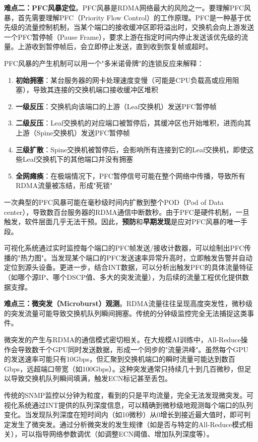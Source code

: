 \textbf{难点二：PFC风暴定位}。PFC风暴是RDMA网络最大的风险之一。要理解PFC风暴，首先需要理解PFC（Priority Flow Control）的工作原理。PFC是一种基于优先级的流量控制机制，当某个端口的接收缓冲区即将溢出时，交换机会向上游发送一个PFC暂停帧（Pause Frame），要求上游在指定时间内停止发送该优先级的流量。上游收到暂停帧后，会立即停止发送，直到收到恢复帧或超时。

PFC风暴的产生机制可以用一个"多米诺骨牌"的连锁反应来解释：
\begin{enumerate}
    \item \textbf{初始拥塞}：某台服务器的网卡处理速度变慢（可能是CPU负载高或应用阻塞），导致其连接的交换机端口接收缓冲区堆积
    \item \textbf{一级反压}：交换机向该端口的上游（Leaf交换机）发送PFC暂停帧
    \item \textbf{二级反压}：Leaf交换机的对应端口被暂停后，其缓冲区也开始堆积，进而向其上游（Spine交换机）发送PFC暂停帧
    \item \textbf{三级扩散}：Spine交换机被暂停后，会影响所有连接到它的Leaf交换机，即使这些Leaf交换机下的其他端口并没有拥塞
    \item \textbf{全网瘫痪}：在极端情况下，PFC暂停信号可能在整个网络中传播，导致所有RDMA流量被冻结，形成"死锁"
\end{enumerate}

一次典型的PFC风暴可能在毫秒级时间内扩散到整个POD（Pod of Data center），导致数百台服务器的RDMA通信中断数秒。由于PFC是硬件机制，一旦触发，软件层面几乎无法干预。因此，\textbf{预防}和\textbf{早期发现}是应对PFC风暴的唯一手段。

可视化系统通过实时监控每个端口的PFC帧发送/接收计数器，可以绘制出PFC传播的"热力图"。当发现某个端口的PFC发送速率异常升高时，立即触发告警并自动定位到源头设备。更进一步，结合INT数据，可以分析出触发PFC的具体流量特征（如哪个源IP、哪个DSCP值、多大的突发流量），为后续的流量工程优化提供数据支撑。

\textbf{难点三：微突发（Microburst）观测}。RDMA流量往往呈现高度突发性，微秒级的突发流量可能导致交换机队列瞬间拥塞。传统的分钟级监控完全无法捕捉这类事件。

微突发的产生与RDMA的通信模式密切相关。在大规模AI训练中，All-Reduce操作会导致数千个GPU同时发送数据，形成一个同步的"流量洪峰"。虽然每个GPU的发送速率可能只有10Gbps，但汇聚到交换机端口的瞬时流量可能达到数百Gbps，远超端口带宽（如100Gbps）。这种突发通常只持续几十到几百微秒，但足以导致交换机队列瞬间填满，触发ECN标记甚至丢包。

传统的SNMP监控以分钟为粒度，看到的只是平均流量，完全无法发现微突发。可视化系统通过INT提供的队列深度信息，可以精确到微秒级地观测每个端口的队列变化。当发现队列深度在短时间内（如10微秒）从0增长到接近最大值时，即可判定发生了微突发。通过分析微突发的发生规律（如是否与特定的All-Reduce模式相关），可以指导网络参数调优（如调整ECN阈值、增加队列深度等）。

